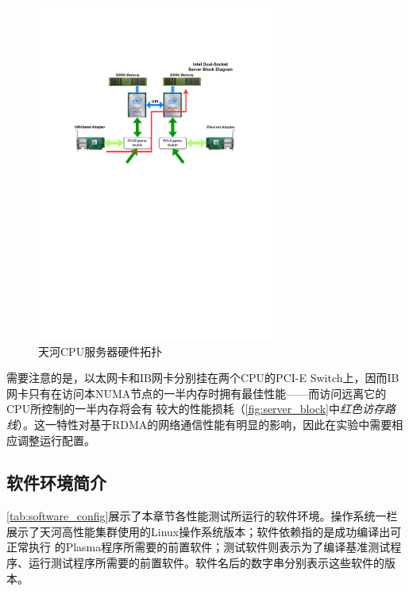 \begin{figure}[h]
	\centering
	\includegraphics[width=0.7\textwidth]{image/chap04/server_block.pdf}
	\caption{天河CPU服务器硬件拓扑}
	\label{fig:server_block}
\end{figure}

需要注意的是，以太网卡和IB网卡分别挂在两个CPU的PCI-E Switch上，因而IB网卡只有在访问本NUMA节点的一半内存时拥有最佳性能——而访问远离它的CPU所控制的一半内存将会有
较大的性能损耗（\autoref{fig:server_block}中\textit{红色访存路线}）。这一特性对基于RDMA的网络通信性能有明显的影响，因此在实验中需要相应调整运行配置。

\subsection{软件环境简介}

\autoref{tab:software_config}展示了本章节各性能测试所运行的软件环境。操作系统一栏展示了天河高性能集群使用的Linux操作系统版本；软件依赖指的是成功编译出可正常执行
的Plasma程序所需要的前置软件；测试软件则表示为了编译基准测试程序、运行测试程序所需要的前置软件。软件名后的数字串分别表示这些软件的版本。

